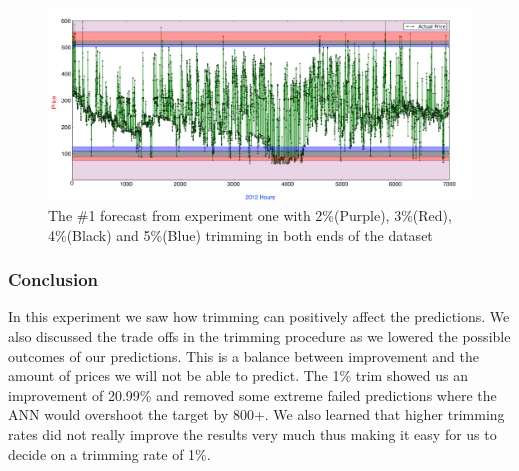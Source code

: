 \begin{figure}[H]
\centering
\includegraphics[width=\linewidth]{billeder/PriceExperimentalAnalysis/restOfTrims.png}
\caption{The \#1 forecast from experiment one with 2\%(Purple), 3\%(Red), 4\%(Black) and 5\%(Blue) trimming in both ends of the dataset}
\label{fig:AllTrims}
\end{figure}

\begin{table}[H]
\centering  %
\caption{Trims} %
\label{table:Top10Trimming} %
\end{table}



\subsubsection{Conclusion}
In this experiment we saw how trimming can positively affect the predictions. We also discussed the trade offs in the trimming procedure as we lowered the possible outcomes of our predictions. This is a balance between improvement and the amount of prices we will not be able to predict. The 1\% trim showed us an improvement of 20.99\% and removed some extreme failed predictions where the ANN would overshoot the target by 800+. We also learned that higher trimming rates did not really improve the results very much thus making it easy for us to decide on a trimming rate of 1\%.

